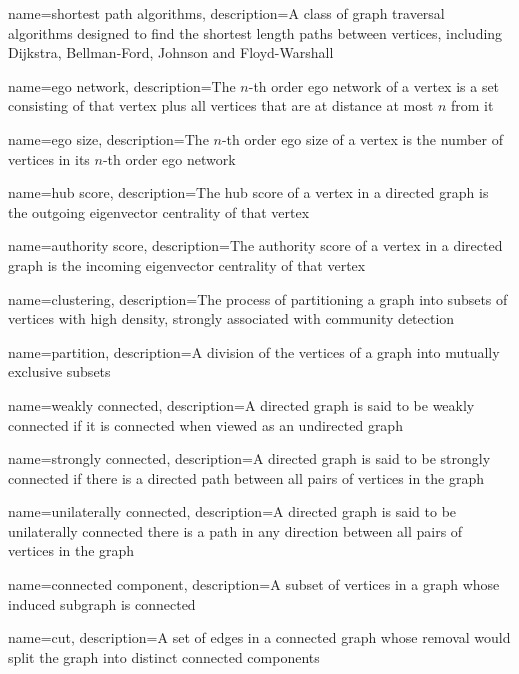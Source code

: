 {
    name={shortest path algorithms},
    description={A class of graph traversal algorithms designed to find the shortest length paths between vertices, including Dijkstra, Bellman-Ford, Johnson and Floyd-Warshall}
}

{
    name={ego network},
    description={The $n$-th order ego network of a vertex is a set consisting of that vertex plus all vertices that are at distance at most $n$ from it}
}

{
    name={ego size},
    description={The $n$-th order ego size of a vertex is the number of vertices in its $n$-th order ego network}
}

{
    name={hub score},
    description={The hub score of a vertex in a directed graph is the outgoing eigenvector centrality of that vertex}
}

{
    name={authority score},
    description={The authority score of a vertex in a directed graph is the incoming eigenvector centrality of that vertex}
}

{
    name={clustering},
    description={The process of partitioning a graph into subsets of vertices with high density, strongly associated with community detection}
}

{
    name={partition},
    description={A division of the vertices of a graph into mutually exclusive subsets}
}

{
    name={weakly connected},
    description={A directed graph is said to be weakly connected if it is connected when viewed as an undirected graph}
}

{
    name={strongly connected},
    description={A directed graph is said to be strongly connected if there is a directed path between all pairs of vertices in the graph}
}

{
    name={unilaterally connected},
    description={A directed graph is said to be unilaterally connected there is a path in any direction between all pairs of vertices in the graph}
}

{
    name={connected component},
    description={A subset of vertices in a graph whose induced subgraph is connected}
}

{
    name={cut},
    description={A set of edges in a connected graph whose removal would split the graph into distinct connected components}
}


